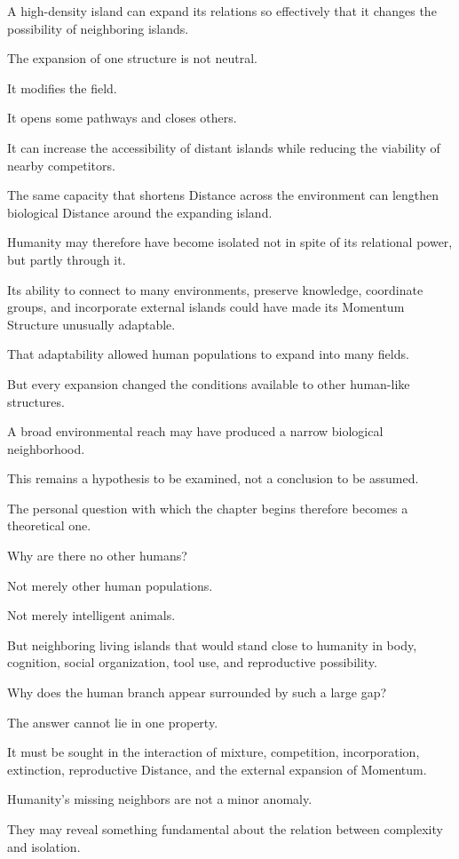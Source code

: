 A high-density island can expand its relations so effectively that it changes the possibility of neighboring islands.

The expansion of one structure is not neutral.

It modifies the field.

It opens some pathways and closes others.

It can increase the accessibility of distant islands while reducing the viability of nearby competitors.

The same capacity that shortens Distance across the environment can lengthen biological Distance around the expanding island.

Humanity may therefore have become isolated not in spite of its relational power, but partly through it.

Its ability to connect to many environments, preserve knowledge, coordinate groups, and incorporate external islands could have made its Momentum Structure unusually adaptable.

That adaptability allowed human populations to expand into many fields.

But every expansion changed the conditions available to other human-like structures.

A broad environmental reach may have produced a narrow biological neighborhood.

This remains a hypothesis to be examined, not a conclusion to be assumed.

The personal question with which the chapter begins therefore becomes a theoretical one.

Why are there no other humans?

Not merely other human populations.

Not merely intelligent animals.

But neighboring living islands that would stand close to humanity in body, cognition, social organization, tool use, and reproductive possibility.

Why does the human branch appear surrounded by such a large gap?

The answer cannot lie in one property.

It must be sought in the interaction of mixture, competition, incorporation, extinction, reproductive Distance, and the external expansion of Momentum.

Humanity’s missing neighbors are not a minor anomaly.

They may reveal something fundamental about the relation between complexity and isolation.

